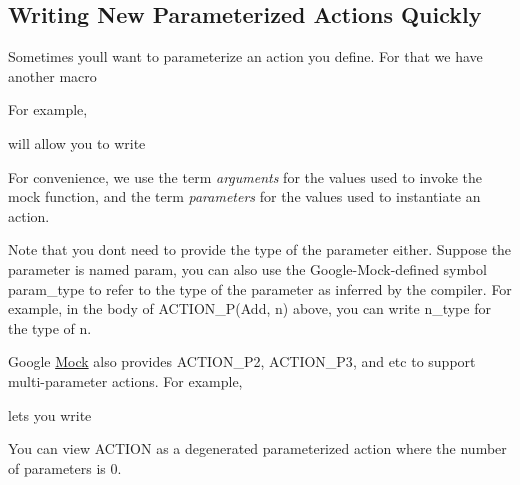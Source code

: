 \subsection*{Writing New Parameterized Actions Quickly}

Sometimes you\textquotesingle{}ll want to parameterize an action you define. For that we have another macro 
\begin{DoxyCode}{0}
\end{DoxyCode}


For example, 
\begin{DoxyCode}{0}
\end{DoxyCode}
 will allow you to write 
\begin{DoxyCode}{0}
\end{DoxyCode}


For convenience, we use the term {\itshape arguments} for the values used to invoke the mock function, and the term {\itshape parameters} for the values used to instantiate an action.

Note that you don\textquotesingle{}t need to provide the type of the parameter either. Suppose the parameter is named {\ttfamily param}, you can also use the Google-\/\+Mock-\/defined symbol {\ttfamily param\+\_\+type} to refer to the type of the parameter as inferred by the compiler. For example, in the body of {\ttfamily A\+C\+T\+I\+O\+N\+\_\+\+P(\+Add, n)} above, you can write {\ttfamily n\+\_\+type} for the type of {\ttfamily n}.

Google \mbox{\hyperlink{class_mock}{Mock}} also provides {\ttfamily A\+C\+T\+I\+O\+N\+\_\+\+P2}, {\ttfamily A\+C\+T\+I\+O\+N\+\_\+\+P3}, and etc to support multi-\/parameter actions. For example, 
\begin{DoxyCode}{0}
\DoxyCodeLine{\}}
\end{DoxyCode}
 lets you write 
\begin{DoxyCode}{0}
\end{DoxyCode}


You can view {\ttfamily A\+C\+T\+I\+ON} as a degenerated parameterized action where the number of parameters is 0.

